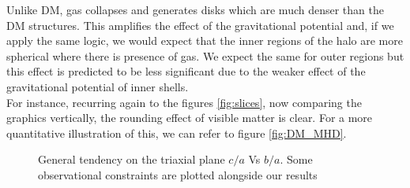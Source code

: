  Unlike DM, gas collapses and generates disks which are much denser than the DM structures. This amplifies the effect of the gravitational potential and, if we apply the same logic, we would expect that the inner regions of the halo are more spherical where there is presence of gas. We expect the same for outer regions but this effect is predicted to be less significant due to the weaker effect of the gravitational potential of inner shells.\\

For instance, recurring again to the figures \ref{fig:slices}, now comparing the graphics vertically, the rounding effect of visible matter is clear. For a more quantitative illustration of this, we can refer to figure \ref{fig:DM_MHD}. \\
\begin{figure}[!ht]
  \centering
  \hfill
  \hfill
  \caption{General tendency on the triaxial plane $c/a$ Vs $b/a$. Some observational constraints are plotted alongside our results}
  \label{fig:Triaxiality_DM_MHD}
\end{figure}

